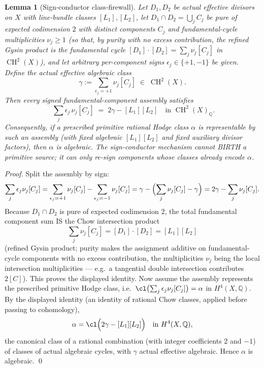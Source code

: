 \documentclass[11pt]{article}
\newtheorem{lemma}[theorem]{Lemma}
\begin{document}
\begin{lemma}[Sign-conductor class-firewall]\label{lem:B1}
Let $D_1,D_2$ be actual effective divisors on $X$ with line-bundle
classes $[L_1],[L_2]$, let
$D_1\cap D_2=\bigcup_j C_j$ be pure of expected codimension $2$ with
distinct components $C_j$ and fundamental-cycle multiplicities
$\nu_j\ge 1$ (so that, by purity with no excess contribution, the
refined Gysin product is the fundamental cycle
$[D_1]\cdot[D_2]=\sum_j\nu_j[C_j]$ in $\operatorname{CH}^2(X)$), and
let arbitrary per-component signs
$\epsilon_j\in\{+1,-1\}$ be given. Define the actual effective algebraic
class
\[
  \gamma:=\sum_{\epsilon_j=+1}\nu_j[C_j]\;\in\;\operatorname{CH}^2(X).
\]
Then every signed fundamental-component assembly satisfies
\[
  \boxed{\;
  \sum_j \epsilon_j\,\nu_j[C_j]\;=\;2\gamma-[L_1][L_2]
  \quad\text{in }\operatorname{CH}^2(X)_{\mathbb Q}.}
\]
Consequently, if a prescribed primitive rational Hodge class $\alpha$
is representable by such an assembly (with fixed algebraic $[L_1][L_2]$
and fixed auxiliary divisor factors), then $\alpha$ is algebraic.
The sign-conductor mechanism cannot BIRTH a primitive source; it can
only re-sign components whose classes already encode $\alpha$.
\end{lemma}

\begin{proof}
Split the assembly by sign:
\[
  \sum_j\epsilon_j\nu_j[C_j]
  =\sum_{\epsilon_j=+1}\nu_j[C_j]-\sum_{\epsilon_j=-1}\nu_j[C_j]
  =\gamma-\Bigl(\sum_j\nu_j[C_j]-\gamma\Bigr)
  =2\gamma-\sum_j\nu_j[C_j].
\]
Because $D_1\cap D_2$ is pure of expected codimension $2$, the
total fundamental component sum IS the Chow intersection product
\[
  \sum_j\nu_j[C_j]=[D_1]\cdot[D_2]=[L_1][L_2]
\]
(refined Gysin product; purity makes the assignment additive on
fundamental-cycle components with no excess contribution, the
multiplicities $\nu_j$ being the local intersection multiplicities
--- e.g.\ a tangential double intersection contributes $2[C]$).
This proves the displayed identity.
Now assume the assembly represents the prescribed primitive Hodge
class, i.e.\ $\cl\bigl(\sum_j\epsilon_j\nu_j[C_j]\bigr)=\alpha$ in
$H^{4}(X,\mathbb Q)$. By the displayed identity (an identity of
rational Chow classes, applied before passing to cohomology),
\[
  \alpha=\cl\Bigl(2\gamma-[L_1][L_2]\Bigr)
  \quad\text{in }H^{4}(X,\mathbb Q),
\]
the canonical class of a rational combination (with integer
coefficients $2$ and $-1$) of classes of actual algebraic cycles,
with $\gamma$ actual effective algebraic. Hence $\alpha$ is
algebraic. \qed
\end{proof}
\end{document}
